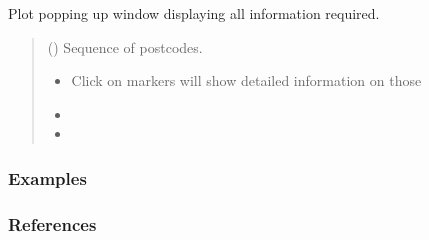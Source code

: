 \documentclass[letterpaper,10pt,english]{sphinxmanual}
\begin{document}
\begin{fulllineitems}
\label{\detokenize{index:flood_tool.plot_popping}}
\pysigstartsignatures
{}
\pysigstopsignatures
\sphinxAtStartPar
Plot popping up window displaying all information required.
\begin{quote}\begin{description}
\sphinxAtStartPar
{} () \textendash{} Sequence of postcodes.

\sphinxAtStartPar
\begin{itemize}
\item {} 
\sphinxAtStartPar
{} \textendash{} Click on markers will show detailed information on those

\item {} 
\sphinxAtStartPar
{}

\item {} 
\sphinxAtStartPar
{}

\end{itemize}


\end{description}\end{quote}
\subsubsection*{Examples}

\begin{sphinxVerbatim}[commandchars=\\\{\}]
\PYG{p}{[} \PYG{p}{]}
\end{sphinxVerbatim}

\end{fulllineitems}

\subsubsection*{References}


\renewcommand{\indexname}{Python Module Index}
\begin{sphinxtheindex}
\let\bigletter\sphinxstyleindexlettergroup
\bigletter{f}
\item\relax{}
\end{sphinxtheindex}

\renewcommand{\indexname}{Index}
\printindex
\end{document}
